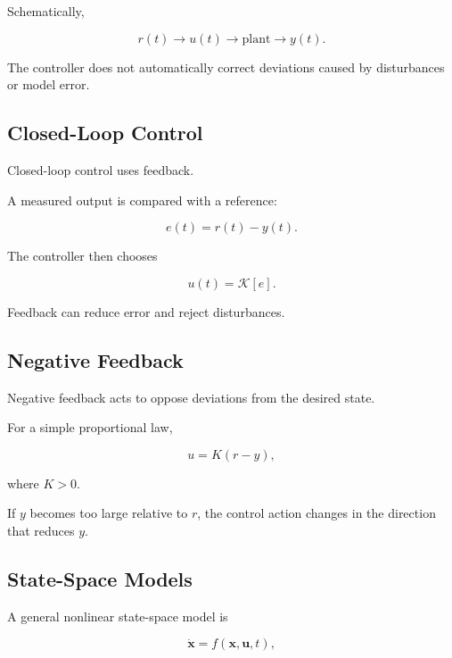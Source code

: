 Schematically,

\[
\boxed{
r(t)
\longrightarrow
u(t)
\longrightarrow
\text{plant}
\longrightarrow
y(t).
}
\]

The controller does not automatically correct deviations caused by
disturbances or model error.

\subsection{Closed-Loop Control}
\label{subsec:closed-loop-control}

Closed-loop control uses feedback.

A measured output is compared with a reference:

\[
\boxed{
e(t)
=
r(t)-y(t).
}
\]

The controller then chooses

\[
\boxed{
u(t)
=
\mathcal{K}[e].
}
\]

Feedback can reduce error and reject disturbances.

\subsection{Negative Feedback}
\label{subsec:negative-feedback-control}

Negative feedback acts to oppose deviations from the desired state.

For a simple proportional law,

\[
\boxed{
u
=
K(r-y),
}
\]

where \(K>0\).

If \(y\) becomes too large relative to \(r\), the control action changes in
the direction that reduces \(y\).

\subsection{State-Space Models}
\label{subsec:control-state-space}

A general nonlinear state-space model is

\[
\boxed{
\dot{\mathbf{x}}
=
f(\mathbf{x},\mathbf{u},t),
}
\]

